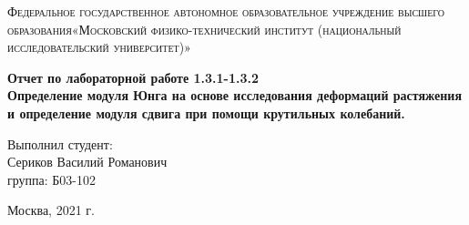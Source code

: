 \documentclass[a4paper, 12pt]{article}%
\begin{document}
	\begin{titlepage}
		\begin{center}
			\textsc{Федеральное государственное автономное образовательное учреждение высшего образования«Московский физико-технический институт (национальный исследовательский университет)»\\[5mm]
			}
			
			\vfill
			
			\textbf{Отчет по лабораторной работе 1.3.1-1.3.2\\[3mm]
				Определение модуля Юнга на основе исследования деформаций растяжения и определение модуля сдвига при помощи крутильных колебаний.
				\\[50mm]
			}
		\end{center}
		
		\hfill
		\begin{minipage}{.5\textwidth}
		Выполнил студент:\\[2mm] 
			Сериков Василий Романович\\[2mm] 
			группа: Б03-102\\[5mm]
			
		\end{minipage}
		\vfill
		\begin{center}
			Москва, 2021 г.
		\end{center}
\end{titlepage}
	
\end{document}
